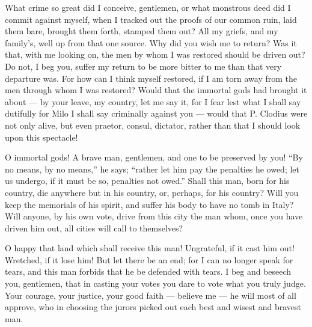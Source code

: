  What crime so great did I conceive, gentlemen, or what monstrous deed did I commit against myself, when I tracked out the proofs of our common ruin, laid them bare, brought them forth, stamped them out? All my griefs, and my family's, well up from that one source. Why did you wish me to return? Was it that, with me looking on, the men by whom I was restored should be driven out? Do not, I beg you, suffer my return to be more bitter to me than that very departure was. For how can I think myself restored, if I am torn away from the men through whom I was restored? Would that the immortal gods had brought it about --- by your leave, my country, let me say it, for I fear lest what I shall say dutifully for Milo I shall say criminally against you --- would that P. Clodius were not only alive, but even praetor, consul, dictator, rather than that I should look upon this spectacle!

 O immortal gods! A brave man, gentlemen, and one to be preserved by you! ``By no means, by no means,'' he says; ``rather let him pay the penalties he owed; let us undergo, if it must be so, penalties not owed.'' Shall this man, born for his country, die anywhere but in his country, or, perhaps, for his country? Will you keep the memorials of his spirit, and suffer his body to have no tomb in Italy? Will anyone, by his own vote, drive from this city the man whom, once you have driven him out, all cities will call to themselves?

 O happy that land which shall receive this man! Ungrateful, if it cast him out! Wretched, if it lose him! But let there be an end; for I can no longer speak for tears, and this man forbids that he be defended with tears. I beg and beseech you, gentlemen, that in casting your votes you dare to vote what you truly judge. Your courage, your justice, your good faith --- believe me --- he will most of all approve, who in choosing the jurors picked out each best and wisest and bravest man.
